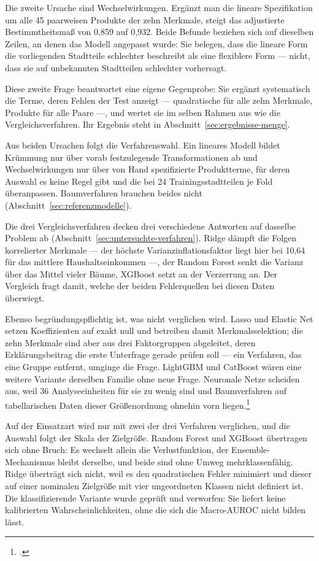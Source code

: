 \documentclass[12pt,a4paper]{article}
\begin{document}
Die zweite Ursache sind Wechselwirkungen. Ergänzt man die lineare Spezifikation
um alle 45 paarweisen Produkte der zehn Merkmale, steigt das adjustierte
Bestimmtheitsmaß von 0,859 auf 0,932. Beide Befunde beziehen sich auf dieselben
Zeilen, an denen das Modell angepasst wurde: Sie belegen, dass die lineare Form
die vorliegenden Stadtteile schlechter beschreibt als eine flexiblere Form ---
nicht, dass sie auf unbekannten Stadtteilen schlechter vorhersagt.

Diese zweite Frage beantwortet eine eigene Gegenprobe: Sie ergänzt systematisch
die Terme, deren Fehlen der Test anzeigt --- quadratische für alle zehn
Merkmale, Produkte für alle Paare ---, und wertet sie im selben Rahmen aus wie
die Vergleichsverfahren. Ihr Ergebnis steht in
Abschnitt~\ref{sec:ergebnisse-menge}.

Aus beiden Ursachen folgt die Verfahrenswahl. Ein lineares Modell bildet
Krümmung nur über vorab festzulegende Transformationen ab und Wechselwirkungen
nur über von Hand spezifizierte Produktterme, für deren Auswahl es keine Regel
gibt und die bei 24 Trainingsstadtteilen je Fold überanpassen. Baumverfahren
brauchen beides nicht (Abschnitt~\ref{sec:referenzmodelle}).

Die drei Vergleichsverfahren decken drei verschiedene Antworten auf dasselbe
Problem ab (Abschnitt~\ref{sec:untersuchte-verfahren}). Ridge dämpft die Folgen
korrelierter Merkmale --- der höchste Varianzinflationsfaktor liegt hier bei
10,64 für das mittlere Haushaltseinkommen ---, der Random Forest senkt die
Varianz über das Mittel vieler Bäume, XGBoost setzt an der Verzerrung an. Der
Vergleich fragt damit, welche der beiden Fehlerquellen bei diesen Daten
überwiegt.

Ebenso begründungspflichtig ist, was nicht verglichen wird. Lasso und Elastic
Net setzen Koeffizienten auf exakt null und betreiben damit Merkmalsselektion;
die zehn Merkmale sind aber aus drei Faktorgruppen abgeleitet, deren
Erklärungsbeitrag die erste Unterfrage gerade prüfen soll --- ein Verfahren,
das eine Gruppe entfernt, umginge die Frage. LightGBM und CatBoost wären eine
weitere Variante derselben Familie ohne neue Frage. Neuronale Netze scheiden
aus, weil 36 Analyseeinheiten für sie zu wenig sind und Baumverfahren auf
tabellarischen Daten dieser Größenordnung ohnehin vorn
liegen.\footcite[1]{Grinsztajn2022}

Auf der Einsatzart wird nur mit zwei der drei Verfahren verglichen, und die
Auswahl folgt der Skala der Zielgröße. Random Forest und XGBoost übertragen
sich ohne Bruch: Es wechselt allein die Verlustfunktion, der
Ensemble-Mechanismus bleibt derselbe, und beide sind ohne Umweg
mehrklassenfähig. Ridge überträgt sich nicht, weil es den quadratischen Fehler
minimiert und dieser auf einer nominalen Zielgröße mit vier ungeordneten
Klassen nicht definiert ist. Die klassifizierende Variante wurde geprüft und
verworfen: Sie liefert keine kalibrierten Wahrscheinlichkeiten, ohne die sich
die Macro-AUROC nicht bilden lässt.
\end{document}
